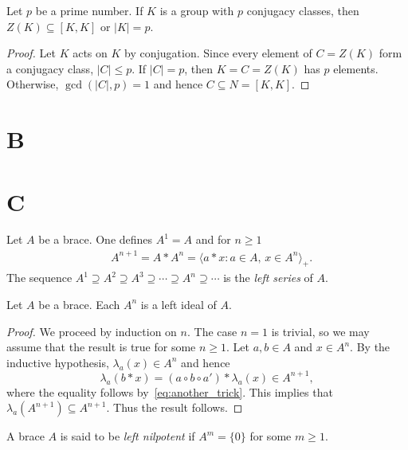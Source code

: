 \begin{corollary}
  Let $p$ be a prime number. If $K$ is a group with $p$ conjugacy classes, then 
  $Z(K)\subseteq[K,K]$ or $|K|=p$. 
\end{corollary}

\begin{proof}
  Let $K$ acts on $K$ by conjugation. Since every element of $C=Z(K)$
  form a conjugacy class, $|C|\leq p$. If $|C|=p$, then $K=C=Z(K)$
  has $p$ elements. Otherwise, $\gcd(|C|,p)=1$ and hence $C\subseteq
  N=[K,K]$.
\end{proof}

\section*{B}


\section*{C}


\begin{definition}
Let $A$ be a brace. One defines
$A^1=A$ and for $n\geq1$
\begin{align*}
    & A^{n+1}=A*A^{n}=\langle a*x: a\in A,\,x\in A^{n}\rangle_+.
\end{align*}
The sequence $A^1\supseteq A^2\supseteq A^3\supseteq\cdots\supseteq A^n\supseteq\cdots$
is the \emph{left series} of $A$.
\end{definition}

\begin{proposition}
    \label{pro:left_series}
    Let $A$ be a brace. Each $A^{n}$ is a left ideal of $A$.
\end{proposition}

\begin{proof}
    We proceed by induction on $n$. The case $n=1$ is trivial, so we may assume
    that the result is true for some $n\geq1$. Let $a,b\in A$ and $x\in A^n$.
    By the inductive hypothesis, $\lambda_a(x)\in A^n$ and hence
    \[
        \lambda_a(b*x)=(a\circ b\circ a')*\lambda_a(x)\in A^{n+1},
    \]
where the equality follows by~\eqref{eq:another_trick}. This implies
that $\lambda_a(A^{n+1})\subseteq A^{n+1}$. Thus the result
follows.
\end{proof}

\begin{definition}
    A brace $A$ is said to be \emph{left nilpotent} if $A^{m}=\{0\}$ for some
    $m\geq1$.
\end{definition}

